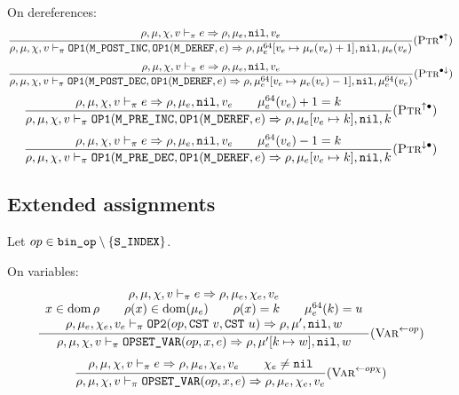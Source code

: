 On dereferences:
\[\dfrac{
    \rho,\mu,\chi,v \vdash_\pi e\Rightarrow \rho,\mu_e,\texttt{nil},v_e
}{\rho,\mu,\chi,v \vdash_\pi \texttt{OP1}(\texttt{M\_POST\_INC}, \texttt{OP1}(\texttt{M\_DEREF}, e) \Rightarrow \rho,\mu_e^{64}[v_e\mapsto \mu_e(v_e)+1],\texttt{nil},\mu_e(v_e)} (\textsc{Ptr}^{\bullet\uparrow})\]
\[\dfrac{
    \rho,\mu,\chi,v \vdash_\pi e\Rightarrow \rho,\mu_e,\texttt{nil},v_e
}{\rho,\mu,\chi,v \vdash_\pi \texttt{OP1}(\texttt{M\_POST\_DEC}, \texttt{OP1}(\texttt{M\_DEREF}, e) \Rightarrow \rho,\mu_e^{64}[v_e\mapsto \mu_e(v_e)-1],\texttt{nil},\mu_e^{64}(v_e)} (\textsc{Ptr}^{\bullet\downarrow})\]
\[\dfrac{
    \rho,\mu,\chi,v \vdash_\pi e\Rightarrow \rho,\mu_e,\texttt{nil},v_e \qquad \mu_e^{64}(v_e)+1 = k
}{\rho,\mu,\chi,v \vdash_\pi \texttt{OP1}(\texttt{M\_PRE\_INC}, \texttt{OP1}(\texttt{M\_DEREF}, e) \Rightarrow \rho,\mu_e[v_e\mapsto k],\texttt{nil},k} (\textsc{Ptr}^{\uparrow \bullet})\]
\[\dfrac{
    \rho,\mu,\chi,v \vdash_\pi e\Rightarrow \rho,\mu_e,\texttt{nil},v_e \qquad \mu_e^{64}(v_e)-1 = k
}{\rho,\mu,\chi,v \vdash_\pi \texttt{OP1}(\texttt{M\_PRE\_DEC}, \texttt{OP1}(\texttt{M\_DEREF}, e) \Rightarrow \rho,\mu_e[v_e\mapsto k],\texttt{nil},k} (\textsc{Ptr}^{\downarrow \bullet})\]

\subsection{Extended assignments}
Let \(op\in \texttt{bin\_op}\setminus \{ \texttt{S\_INDEX} \}\).

On variables:
\[\dfrac{\begin{array}{c}
    \rho,\mu,\chi,v \vdash_\pi e\Rightarrow \rho,\mu_e,\chi_e,v_e \\
    x\in\operatorname{dom}\rho \qquad \rho(x)\in\operatorname{dom}(\mu_e) \qquad \rho(x) = k \qquad \mu_e^{64}(k) = u \\
    \rho,\mu_e,\chi_e,v_e \vdash_\pi \texttt{OP2}(op, \texttt{CST}\ v, \texttt{CST}\ u) \Rightarrow \rho,\mu',\texttt{nil},w
\end{array}}{\rho,\mu,\chi,v \vdash_\pi \texttt{OPSET\_VAR}(op, x, e) \Rightarrow \rho,\mu'[k\mapsto w],\texttt{nil},w} (\textsc{Var}^{\gets op})\]
\[\dfrac{\begin{array}{c}
    \rho,\mu,\chi,v \vdash_\pi e\Rightarrow \rho,\mu_e,\chi_e,v_e \qquad \chi_e\ne\texttt{nil}\\
\end{array}}{\rho,\mu,\chi,v \vdash_\pi \texttt{OPSET\_VAR}(op, x, e) \Rightarrow \rho,\mu_e,\chi_e,v_e} (\textsc{Var}^{\gets op\chi})\]

